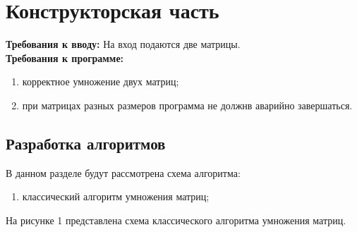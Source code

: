 \documentclass[a4paper, 12pt]{article}
\begin{document}
\section{Конструкторская часть}
\begin{flushleft}
	{\bf Требования к вводу: } На вход подаются две матрицы.
	\\ {\bf Требования к программе: }
	\begin{enumerate}
		\item корректное умножение двух матриц;
		\item при матрицах разных размеров программа не должнв аварийно завершаться. 
	\end{enumerate}
	\subsection{Разработка алгоритмов}
	В данном разделе будут рассмотрена схема алгоритма:
	\begin{enumerate}
		\item классический алгоритм умножения матриц;
	\end{enumerate}
	\clearpage
	\newpage
	\hspace*{5mm} На рисунке 1 представлена схема классического алгоритма умножения матриц.
	\begin{figure}[h!]

\end{figure}
\end{flushleft}
\end{document}
